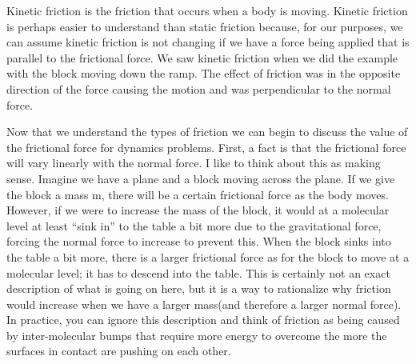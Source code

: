 \documentclass{article}[gray]
\numberwithin{equation}{subsection}
\begin{document}
Kinetic friction is the friction that occurs when a body is moving.  Kinetic friction is perhaps easier to understand than static friction because, for our purposes, we can assume kinetic friction is not changing if we have a force being applied that is parallel to the frictional force. We saw kinetic friction when we did the example with the block moving down the ramp. The effect of friction was in the opposite direction of the force causing the motion and was perpendicular to the normal force.

Now that we understand the types of friction we can begin to discuss the value of the frictional force for dynamics problems. First, a fact is that the frictional force will vary linearly with the normal force. I like to think about this as making sense. Imagine we have a plane and a block moving across the plane. If we give the block a mass m, there will be a certain frictional force as the body moves. However, if we were to increase the mass of the block, it would at a molecular level at least “sink in” to the table a bit more due to the gravitational force, forcing the normal force to increase to prevent this. When the block sinks into the table a bit more, there is a larger frictional force as for the block to move at a molecular level; it has to descend into the table. This is certainly not an exact description of what is going on here, but it is a way to rationalize why friction would increase when we have a larger mass(and therefore a larger normal force). In practice, you can ignore this description and think of friction as being caused by inter-molecular bumps that require more energy to overcome the more the surfaces in contact are pushing on each other. 
\end{document}
